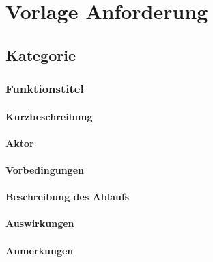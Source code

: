 \documentclass[10pt,a4paper]{article}
\begin{document}
    \section{Vorlage Anforderung}
    \subsection{Kategorie}
    \subsubsection{\textbf{Funktionstitel}}
    \paragraph{Kurzbeschreibung}
    \paragraph{Aktor}
    \paragraph{Vorbedingungen}
    \paragraph{Beschreibung des Ablaufs}
    \paragraph{Auswirkungen}
    \paragraph{Anmerkungen}
\end{document}
